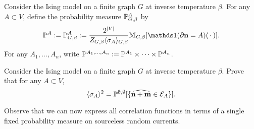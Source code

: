 \begin{definition}
    Consider the Ising model on a finite graph $G$
    at inverse temperature $\beta$.
    For any $A\subset V$,
    define the probability measure $\P^A_{G,\beta}$ by
    \[
        \P^A:=\P^A_{G,\beta}:=\frac{2^{|V|}}{Z_{G,\beta}\langle\sigma_A\rangle_{G,\beta}}\M_{G,\beta}[\true{\partial\n=A}(\blank)].
    \]
    For any $A_1,\ldots,A_n$,
    write $\P^{A_1,\ldots,A_n}:=\P^{A_1}\times\cdots\times\P^{A_n}$.
\end{definition}

\begin{exercise}
    Consider the Ising model on a finite graph $G$
    at inverse temperature $\beta$.
    Prove that for any $A\subset V$,
    \[
        \langle\sigma_A\rangle^2
        =
        \P^{\emptyset,\emptyset}[\{\widehat{\n+\m}\in\calE_A\}].
    \]

    Observe that we can now express all correlation functions in terms of a single
    fixed probability measure on sourceless random currents.
\end{exercise}
